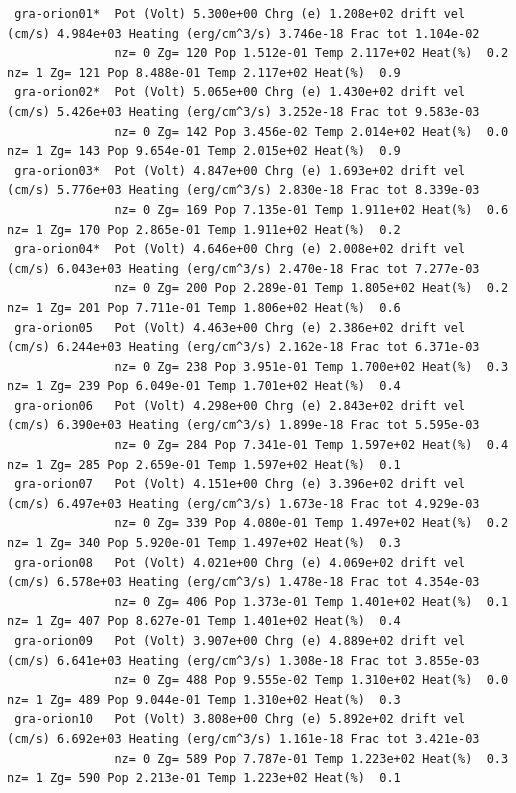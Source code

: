 {\setverbatimfontsize{\tiny}
\begin{verbatim}
 gra-orion01*  Pot (Volt) 5.300e+00 Chrg (e) 1.208e+02 drift vel (cm/s) 4.984e+03 Heating (erg/cm^3/s) 3.746e-18 Frac tot 1.104e-02
               nz= 0 Zg= 120 Pop 1.512e-01 Temp 2.117e+02 Heat(%)  0.2      nz= 1 Zg= 121 Pop 8.488e-01 Temp 2.117e+02 Heat(%)  0.9
 gra-orion02*  Pot (Volt) 5.065e+00 Chrg (e) 1.430e+02 drift vel (cm/s) 5.426e+03 Heating (erg/cm^3/s) 3.252e-18 Frac tot 9.583e-03
               nz= 0 Zg= 142 Pop 3.456e-02 Temp 2.014e+02 Heat(%)  0.0      nz= 1 Zg= 143 Pop 9.654e-01 Temp 2.015e+02 Heat(%)  0.9
 gra-orion03*  Pot (Volt) 4.847e+00 Chrg (e) 1.693e+02 drift vel (cm/s) 5.776e+03 Heating (erg/cm^3/s) 2.830e-18 Frac tot 8.339e-03
               nz= 0 Zg= 169 Pop 7.135e-01 Temp 1.911e+02 Heat(%)  0.6      nz= 1 Zg= 170 Pop 2.865e-01 Temp 1.911e+02 Heat(%)  0.2
 gra-orion04*  Pot (Volt) 4.646e+00 Chrg (e) 2.008e+02 drift vel (cm/s) 6.043e+03 Heating (erg/cm^3/s) 2.470e-18 Frac tot 7.277e-03
               nz= 0 Zg= 200 Pop 2.289e-01 Temp 1.805e+02 Heat(%)  0.2      nz= 1 Zg= 201 Pop 7.711e-01 Temp 1.806e+02 Heat(%)  0.6
 gra-orion05   Pot (Volt) 4.463e+00 Chrg (e) 2.386e+02 drift vel (cm/s) 6.244e+03 Heating (erg/cm^3/s) 2.162e-18 Frac tot 6.371e-03
               nz= 0 Zg= 238 Pop 3.951e-01 Temp 1.700e+02 Heat(%)  0.3      nz= 1 Zg= 239 Pop 6.049e-01 Temp 1.701e+02 Heat(%)  0.4
 gra-orion06   Pot (Volt) 4.298e+00 Chrg (e) 2.843e+02 drift vel (cm/s) 6.390e+03 Heating (erg/cm^3/s) 1.899e-18 Frac tot 5.595e-03
               nz= 0 Zg= 284 Pop 7.341e-01 Temp 1.597e+02 Heat(%)  0.4      nz= 1 Zg= 285 Pop 2.659e-01 Temp 1.597e+02 Heat(%)  0.1
 gra-orion07   Pot (Volt) 4.151e+00 Chrg (e) 3.396e+02 drift vel (cm/s) 6.497e+03 Heating (erg/cm^3/s) 1.673e-18 Frac tot 4.929e-03
               nz= 0 Zg= 339 Pop 4.080e-01 Temp 1.497e+02 Heat(%)  0.2      nz= 1 Zg= 340 Pop 5.920e-01 Temp 1.497e+02 Heat(%)  0.3
 gra-orion08   Pot (Volt) 4.021e+00 Chrg (e) 4.069e+02 drift vel (cm/s) 6.578e+03 Heating (erg/cm^3/s) 1.478e-18 Frac tot 4.354e-03
               nz= 0 Zg= 406 Pop 1.373e-01 Temp 1.401e+02 Heat(%)  0.1      nz= 1 Zg= 407 Pop 8.627e-01 Temp 1.401e+02 Heat(%)  0.4
 gra-orion09   Pot (Volt) 3.907e+00 Chrg (e) 4.889e+02 drift vel (cm/s) 6.641e+03 Heating (erg/cm^3/s) 1.308e-18 Frac tot 3.855e-03
               nz= 0 Zg= 488 Pop 9.555e-02 Temp 1.310e+02 Heat(%)  0.0      nz= 1 Zg= 489 Pop 9.044e-01 Temp 1.310e+02 Heat(%)  0.3
 gra-orion10   Pot (Volt) 3.808e+00 Chrg (e) 5.892e+02 drift vel (cm/s) 6.692e+03 Heating (erg/cm^3/s) 1.161e-18 Frac tot 3.421e-03
               nz= 0 Zg= 589 Pop 7.787e-01 Temp 1.223e+02 Heat(%)  0.3      nz= 1 Zg= 590 Pop 2.213e-01 Temp 1.223e+02 Heat(%)  0.1

\end{verbatim}}
